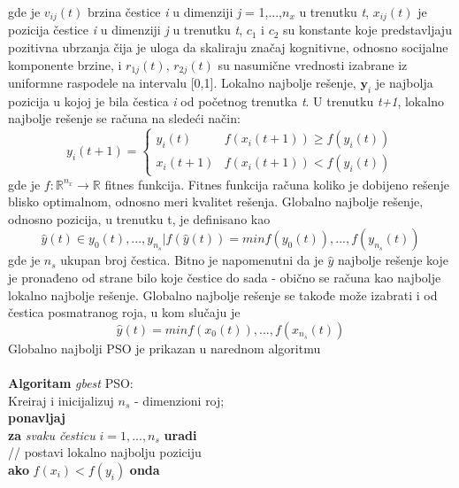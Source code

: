 \documentclass[a4paper]{article}
\begin{document}
gde je $v_{ij}(t)$ brzina čestice \textit{i} u dimenziji \textit{j} = 1,...,$n_x$ u trenutku \textit{t}, $x_{ij}(t)$ je pozicija čestice \textit{i} u dimenziji \textit{j} u trenutku \textit{t}, $c_1$ i $c_2$ su konstante koje predstavljaju pozitivna ubrzanja čija je uloga da skaliraju značaj kognitivne, odnosno socijalne komponente brzine, i $r_{1j}(t)$, $r_{2j}(t)$ su nasumične vrednosti izabrane iz uniformne raspodele na intervalu [0,1].
Lokalno najbolje rešenje, $\textbf{y}_i$ je najbolja pozicija u kojoj je bila čestica \textit{i} od početnog trenutka \textit{t}. U trenutku \textit{t+1}, lokalno najbolje rešenje se računa na sledeći način:
\begin{equation}
    y_i(t+1) = \begin{cases}
                
            y_i(t)  & f(x_i(t+1)) \geq f(y_i(t)) \\
            x_i(t+1)  & f(x_i(t+1)) < f(y_i(t))
           
             \end{cases}
\end{equation}
gde je $f:\mathbb{R}^{n_x} \to \mathbb{R}$ fitnes funkcija. Fitnes funkcija računa koliko je dobijeno rešenje blisko optimalnom, odnosno meri kvalitet rešenja. Globalno najbolje rešenje, odnosno pozicija, u trenutku t, je definisano kao
\[\hat{y}(t) \in {y_0(t),...,y_{n_s}|f(\hat{y}(t)) = min{f(y_0(t)),...,f(y_{n_s}(t))}} \]
gde je $n_s$ ukupan broj čestica. Bitno je napomenutni da je $\hat{y}$ najbolje rešenje koje je pronađeno od strane bilo koje čestice do sada - obično se računa kao najbolje lokalno najbolje rešenje. Globalno najbolje rešenje se takođe može izabrati i od čestica posmatranog roja, u kom slučaju je \[\hat{y}(t) = min{f(x_0(t)),...,f(x_{n_s}(t))}\]
Globalno najbolji PSO je prikazan u narednom algoritmu \\ \\
\textbf{Algoritam} \textit{gbest} PSO: \\ 
Kreiraj i inicijalizuj $n_s$ - dimenzioni roj;\\
\textbf{ponavljaj} \\ 
\hspace*{5mm}\textbf{za} \textit{svaku česticu} $\textit{i} = 1,...,n_s$ \textbf{uradi} \\
\hspace*{5mm} // postavi lokalno najbolju poziciju \\
\hspace*{10mm} \textbf{ako} $f(x_i) < f(y_i)$ \textbf{onda} \\
\end{document}
